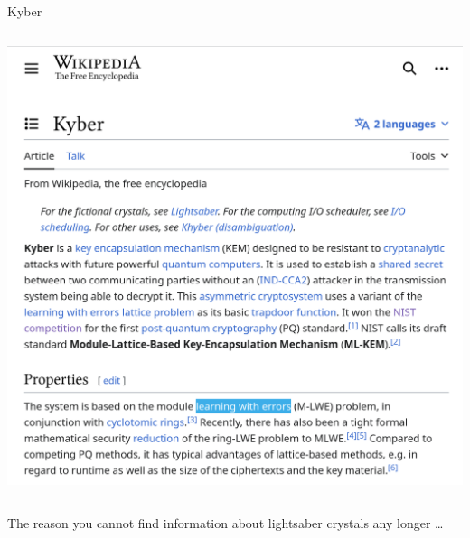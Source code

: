 \documentclass[xcolor=table,10pt,aspectratio=169]{beamer}
\begin{document}
\begin{frame}[label={sec:org89f83ec}]{Kyber}
\begin{columns}[t]
\begin{column}{0.5\columnwidth}
\begin{center}
\includegraphics[keepaspectratio,height=.75\textheight]{./kyber.png}
\end{center}
\end{column}
\end{columns}

The reason you cannot find information about lightsaber crystals any longer …
\end{frame}
\end{document}
